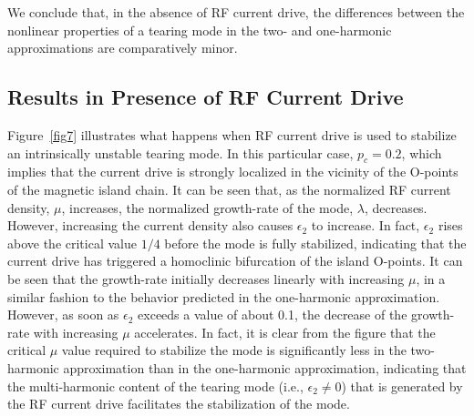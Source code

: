 \documentclass[12pt,prb,aps]{revtex4-1}
\begin{document}
We conclude that, in the absence of RF current drive, the differences between the nonlinear properties
of a tearing mode in the two- and one-harmonic approximations are comparatively minor. 

\subsection{Results in Presence of RF Current Drive}
Figure~\ref{fig7} illustrates what happens when RF current drive is used to stabilize an intrinsically unstable tearing mode. In this particular case, $p_c=0.2$, which implies that the current drive is strongly localized in the vicinity of
the O-points of the magnetic island chain. It can be seen that, as the normalized RF current density, $\mu$, increases,
the normalized growth-rate of the mode, $\lambda$, decreases. However,  increasing the current
density also causes $\epsilon_2$ to increase. In fact, $\epsilon_2$ rises above the critical value $1/4$ before the
mode is fully stabilized, indicating that the current drive has triggered a homoclinic bifurcation of the island O-points. 
It can be seen that the growth-rate initially decreases linearly with increasing $\mu$, in a similar fashion to the behavior predicted in the one-harmonic approximation. However, as soon as $\epsilon_2$ exceeds a value of about 0.1, the
decrease of the growth-rate with increasing $\mu$ accelerates. In fact, it is clear from the figure that
the critical $\mu$ value required to stabilize the mode is significantly less in the two-harmonic approximation than in the
one-harmonic approximation, indicating that the multi-harmonic content of the tearing mode (i.e., $\epsilon_2\neq 0$) that is
generated by the RF current drive facilitates the stabilization of the mode. 
\end{document}
